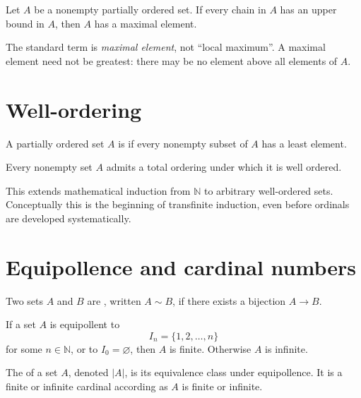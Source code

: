 \begin{theorem}
Let \(A\) be a nonempty partially ordered set.  If every chain in \(A\) has an upper bound in \(A\), then \(A\) has a maximal element.
\end{theorem}

\begin{caution}
The standard term is \emph{maximal element}, not ``local maximum''.  A maximal element need not be greatest: there may be no element above all elements of \(A\).
\end{caution}

\section{Well-ordering}

\begin{definition}
A partially ordered set \(A\) is  if every nonempty subset of \(A\) has a least element.
\end{definition}

\begin{proposition}
Every nonempty set \(A\) admits a total ordering under which it is well ordered.
\end{proposition}

\begin{remark}
This extends mathematical induction from \(\mathbb N\) to arbitrary well-ordered sets.  Conceptually this is the beginning of transfinite induction, even before ordinals are developed systematically.
\end{remark}

\section{Equipollence and cardinal numbers}

\begin{definition}
Two sets \(A\) and \(B\) are , written \(A\sim B\), if there exists a bijection \(A\to B\).
\end{definition}

\begin{definition}
If a set \(A\) is equipollent to
\[
  I_n=\{1,2,\dots,n\}
\]
for some \(n\in\mathbb N\), or to \(I_0=\varnothing\), then \(A\) is finite.  Otherwise \(A\) is infinite.
\end{definition}

\begin{definition}
The  of a set \(A\), denoted \(|A|\), is its equivalence class under equipollence.  It is a finite or infinite cardinal according as \(A\) is finite or infinite.
\end{definition}


